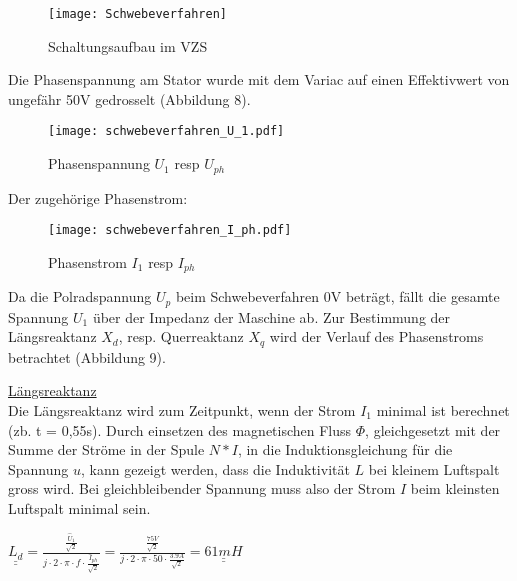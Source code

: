 \begin{flushleft}
 \begin{figure}[H]
    \centering
        \texttt{[image: Schwebeverfahren]}
    \caption{Schaltungsaufbau im VZS}
    \label{fig:SchaltungsaufbauSchwebeverfahren}
\end{figure}


Die Phasenspannung am Stator wurde mit dem Variac auf einen Effektivwert von ungefähr 50V gedrosselt (Abbildung 8). 


\begin{figure}[H]
    \centering
        \texttt{[image: schwebeverfahren\_U\_1.pdf]}
    \caption{Phasenspannung $U_1$ resp $U_{ph}$}
    \label{fig:PhasenspannungSchwebeverfahren}
\end{figure}


\newpage

Der zugehörige Phasenstrom:\\
\vspace{0.3cm}
\begin{figure}[H]
    \centering
        \texttt{[image: schwebeverfahren\_I\_ph.pdf]}
    \caption{Phasenstrom $I_1$ resp $I_{ph}$}
    \label{fig:PhasenstromSchwebeverfahren}
\end{figure}


Da die Polradspannung $U_p$ beim Schwebeverfahren 0V beträgt, fällt die gesamte Spannung $U_1$ über der Impedanz der Maschine ab. 
Zur Bestimmung der Längsreaktanz $X_d$, resp. Querreaktanz $X_q$ wird der Verlauf des Phasenstroms betrachtet (Abbildung 9).\\
\vspace{0.4cm}

\underline{Längsreaktanz}\\
\vspace{0.2cm}
Die Längsreaktanz wird zum Zeitpunkt, wenn der Strom $I_1$ minimal ist  berechnet (zb. t = 0,55s). 
Durch einsetzen des magnetischen Fluss $\Phi$, gleichgesetzt mit der Summe der Ströme in der Spule $N*I$, in die Induktionsgleichung für die Spannung $u$, kann gezeigt werden, dass die Induktivität $L$ bei kleinem Luftspalt gross wird. Bei gleichbleibender Spannung muss also der Strom $I$ beim kleinsten Luftspalt minimal sein. 


\begin{center}
\begin{Large}
$ \underline{\underline{L_d}}= \frac{\frac{\hat{U}_1}{\sqrt{2}}}{j \cdot 2 \cdot \pi \cdot f \cdot \frac{\hat{I}_{ph}}{\sqrt{2}} }  = \frac{\frac{75 V}{\sqrt{2}}}{j \cdot 2 \cdot \pi \cdot 50 \cdot \frac{3.9 A}{\sqrt{2}} } = \underline{\underline{61 mH}}$\\
\end{Large}
\end{center}



\end{flushleft}

